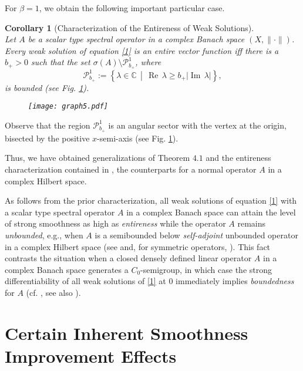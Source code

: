 \documentclass{amsart}
\theoremstyle{plain}
\newtheorem{cor}{Corollary}[section]
\theoremstyle{definition}
\begin{document}
For $\beta=1$, we obtain the following important particular case.

\begin{cor}[Characterization of the Entireness of Weak Solutions]\label{CEWS}\ \\
Let $A$ be a scalar type spectral operator in a complex Banach space $(X,\|\cdot\|)$. Every weak solution of equation \eqref{1} is an entire vector function iff there is a $b_+>0$ such that the set $\sigma(A)\setminus {\mathscr P}^{1}_{b_+}$, where
\begin{equation*}
{\mathscr P}^{1}_{b_+}:= \left\{ \lambda \in {{\mathbb C}}\,\middle|\,
\operatorname{Re\,}\lambda \ge b_+|\operatorname{Im\,}\lambda|\right\},
\end{equation*}
is bounded (see Fig. \ref{fig:graph5}).

\begin{figure}[h]
\centering
\texttt{[image: graph5.pdf]}
\caption[]{}
\label{fig:graph5}
\end{figure}
\end{cor}

Observe that the region ${\mathscr P}^{1}_{b_+}$
is an angular sector with the vertex at the origin,
bisected by the positive $x$-semi-axis (see Fig. \ref{fig:graph5}).

Thus, we have obtained generalizations of Theorem $4.1$ and the entireness characterization contained in \cite{Markin2001(1)}, the counterparts for a normal operator $A$ in a complex Hilbert space.

As follows from the prior characterization, all weak solutions of equation \eqref{1} with a scalar type spectral operator $A$ in a complex Banach space can 
attain the level of strong smoothness as high as \textit{entireness} while the operator $A$ remains \textit{unbounded}, e.g., when $A$ is a semibounded below \textit{self-adjoint} unbounded operator in a complex Hilbert space (see {\cite[Corollary $4.1$]{Markin2001(1)}} and, for symmetric operators, {\cite[Theorem $6.1$]{Markin2001(1)}}). This fact contrasts the situation when a closed densely defined linear operator $A$ in a complex Banach space generates a $C_0$-semigroup, in which case the strong differentiability of all weak solutions of \eqref{1} at $0$ immediately implies \textit{boundedness} for $A$ (cf. \cite{Engel-Nagel}, see also \cite{Markin2002(2)}).

\section{Certain Inherent Smoothness Improvement Effects}
\end{document}
